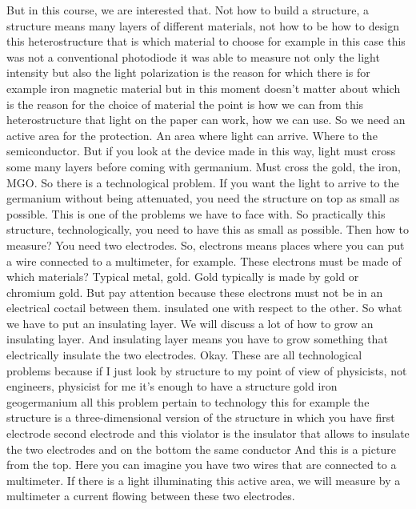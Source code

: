 But in this course, we are interested that. Not how to build a structure, a structure means many layers of different materials, not how to be how to design this heterostructure that is which material to choose for example in this case this was not a conventional photodiode it was able to measure not only the light intensity but also the light polarization is the reason for which there is for example iron magnetic material but in this moment doesn't matter about which is the reason for the choice of material the point is how we can from this heterostructure that light on the paper can work, how we can use. So we need an active area for the protection. An area where light can arrive. Where to the semiconductor. But if you look at the device made in this way, light must cross some many layers before coming with germanium. Must cross the gold, the iron, MGO. So there is a technological problem. If you want the light to arrive to the germanium without being attenuated, you need the structure on top as small as possible. This is one of the problems we have to face with. So practically this structure, technologically, you need to have this as small as possible. Then how to measure? You need two electrodes. So, electrons means places where you can put a wire connected to a multimeter, for example. These electrons must be made of which materials? Typical metal, gold. Gold typically is made by gold or chromium gold. But pay attention because these electrons must not be in an electrical coctail between them. insulated one with respect to the other. So what we have to put an insulating layer. We will discuss a lot of how to grow an insulating layer. And insulating layer means you have to grow something that electrically insulate the two electrodes. Okay. These are all technological problems because if I just look by structure to my point of view of physicists, not engineers, physicist for me it's enough to have a structure gold iron geogermanium all this problem pertain to technology this for example the structure is a three-dimensional version of the structure in which you have first electrode second electrode and this violator is the insulator that allows to insulate the two electrodes and on the bottom the same conductor And this is a picture from the top. Here you can imagine you have two wires that are connected to a multimeter. If there is a light illuminating this active area, we will measure by a multimeter a current flowing between these two electrodes.
